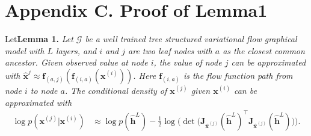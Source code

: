 \documentclass{article} %
\begin{document}
\section*{Appendix C.  Proof of Lemma1}\label{appd:proof}
Let\textbf{Lemma 1.} {\it Let $\mathcal{G}$ be a well trained tree structured variational flow graphical model with $L$ layers, and $i$ and $j$ are two leaf nodes with $a$ as the closest common ancestor. Given observed value at node $i$, the value of node $j$ can be approximated with   $\widehat{\mathbf{x}}^{j} \approx  \mathbf{f}_{(a,j)}(\mathbf{f}_{(i, a)}(\mathbf{x}^{(i)}))$. Here $\mathbf{f}_{(i, a)}$ is the flow function path from node $i$ to node $a$. The conditional density of $\mathbf{x}^{(j)}$ given $\mathbf{x}^{(i)}$ can be approximated with 
\begin{align*} %
\log p(\mathbf{x}^{(j)} | \mathbf{x}^{(i)}) &\approx  \log p(\widehat{\mathbf{h}}^L) -  \frac{1}{2} \log \big(\det \big(\mathbf{J}_{\widehat{\mathbf{x}}^{(j)}}(\widehat{\mathbf{h}}^L)^\top\mathbf{J}_{\widehat{\mathbf{x}}^{(j)}}(\widehat{\mathbf{h}}^L)\big) \big).
\end{align*}
}
\end{document}
